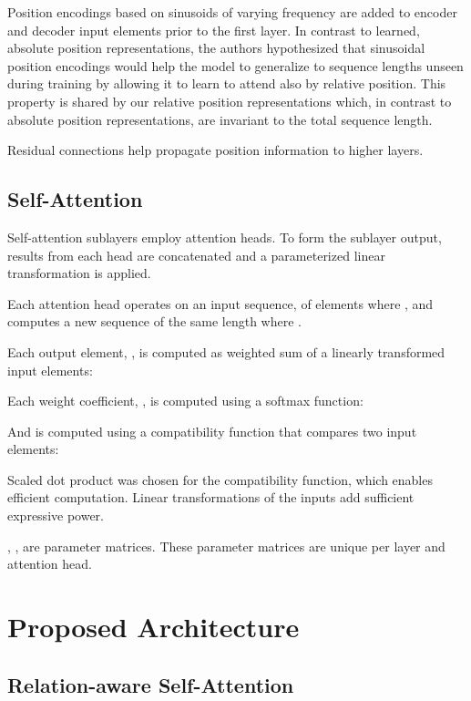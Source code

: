 \documentclass[11pt,a4paper]{article}
\begin{document}
Position encodings based on sinusoids of varying frequency are added to encoder and decoder input elements prior to the first layer.
In contrast to learned, absolute position representations, the authors hypothesized that sinusoidal position encodings would help the model to generalize to sequence lengths unseen during training by allowing it to learn to attend also by relative position. This property is shared by our relative position representations which, in contrast to absolute position representations, are invariant to the total sequence length.

Residual connections help propagate position information to higher layers.


\subsection{Self-Attention}\label{selfattn}

Self-attention sublayers employ  attention heads.
To form the sublayer output, results from each head are concatenated and a parameterized linear transformation is applied.


Each attention head operates on an input sequence,  of
 elements where , and computes a new sequence  of the same length
where .

Each output element, , is computed as weighted sum of a linearly transformed input elements:



Each weight coefficient, , is computed using a softmax function:



And  is computed using a compatibility function that compares two input elements:



Scaled dot product was chosen for the compatibility function, which enables efficient computation.
Linear transformations of the inputs add sufficient expressive power.

, ,  are parameter
matrices. These parameter matrices are unique per layer and attention head.

\section{Proposed Architecture}

\subsection{Relation-aware Self-Attention}\label{secselfattn}
\end{document}
